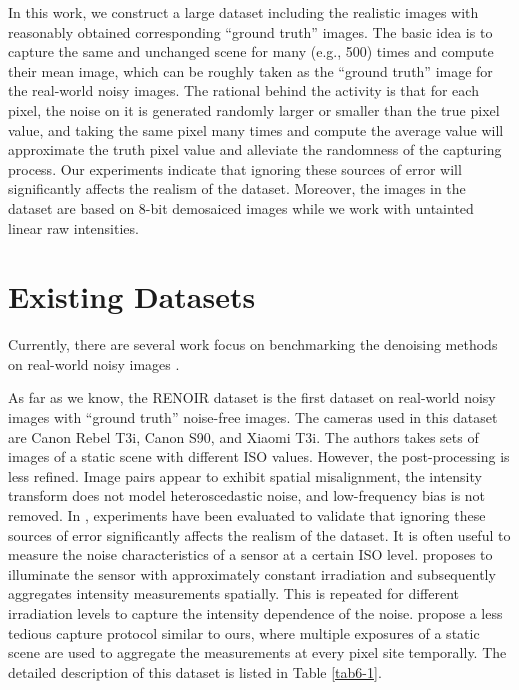 In this work, we construct a large dataset including the realistic images with reasonably obtained corresponding ``ground truth'' images. The basic idea is to capture the same and unchanged scene for many (e.g., 500) times and compute their mean image, which can be roughly taken as the ``ground truth'' image for the real-world noisy images. The rational behind the activity is that for each pixel, the noise on it is generated randomly larger or smaller than the true pixel value, and taking the same pixel many times and compute the average value will approximate the truth pixel value and alleviate the randomness of the capturing process. Our experiments indicate that ignoring these sources of error will significantly affects the realism of the dataset. Moreover, the images in the dataset \cite{crosschannel2016} are based on $8$-bit demosaiced images while we work with untainted linear raw intensities.

\section{Existing Datasets}

Currently, there are several work focus on benchmarking the denoising methods on real-world noisy images \cite{RENOIR2014,crosschannel2016,dnd2017}.

As far as we know, the RENOIR dataset \cite{RENOIR2014} is the first dataset on real-world noisy images with ``ground truth'' noise-free images. The cameras used in this dataset are Canon Rebel T3i, Canon S90, and Xiaomi T3i. The authors takes sets of images of a static scene with different ISO values. However, the post-processing is less refined. Image pairs appear to exhibit spatial misalignment, the intensity transform does not model heteroscedastic noise, and low-frequency bias is not removed. In \cite{RENOIR2014}, experiments have been evaluated to validate that ignoring these sources of error significantly
affects the realism of the dataset. It is often useful to measure the noise characteristics of a sensor at a certain ISO level. \cite{RENOIR2014} proposes to illuminate the sensor with approximately constant irradiation and subsequently aggregates intensity measurements spatially. This is repeated for different irradiation levels to capture the intensity dependence of the noise. \cite{RENOIR2014} propose a less tedious capture protocol similar to ours, where multiple exposures of a static scene are used to aggregate the measurements at every pixel site temporally. The detailed description of this dataset is listed in Table \ref{tab6-1}.

